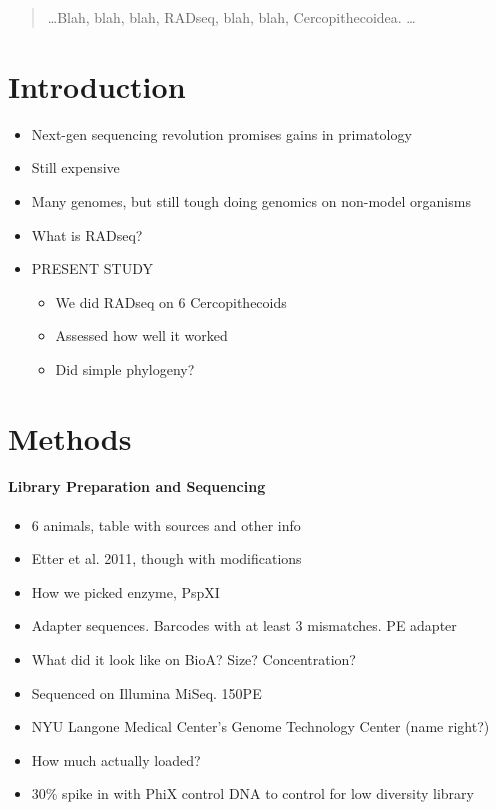 \documentclass[12pt]{article}
\begin{document}
\maketitle

\begin{abstract}
\ldots Blah, blah, blah, RADseq, blah, blah, Cercopithecoidea. \ldots
\end{abstract}

\section{Introduction}
\begin{itemize}
	\item Next-gen sequencing revolution promises gains in primatology
	\item Still expensive
	\item Many genomes, but still tough doing genomics on non-model organisms
	\item What is RADseq?
	\item PRESENT STUDY
	\begin{itemize}
		\item We did RADseq on 6 Cercopithecoids
		\item Assessed how well it worked
		\item Did simple phylogeny?
	\end{itemize}
\end{itemize}

\section{Methods}

\paragraph{Library Preparation and Sequencing}
\begin{itemize}
	\item 6 animals, table with sources and other info
	\item Etter et al. 2011, though with modifications
	\item How we picked enzyme, PspXI
	\item Adapter sequences. Barcodes with at least 3 mismatches. PE adapter
	\item What did it look like on BioA? Size? Concentration?
	\item Sequenced on Illumina MiSeq. 150PE
	\item NYU Langone Medical Center's Genome Technology Center (name right?)
	\item How much actually loaded?
	\item 30\% spike in with PhiX control DNA to control for low diversity library
\end{itemize}
\end{document}
